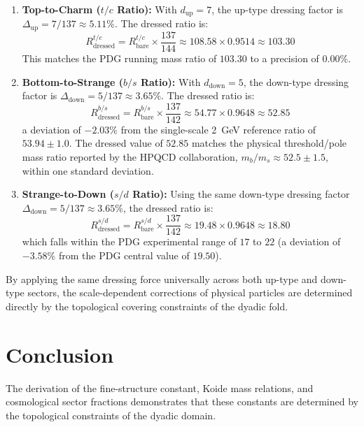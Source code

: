 \documentclass[11pt,a4paper]{article}
\begin{document}
\begin{enumerate}
\item \textbf{Top-to-Charm ($t/c$ Ratio):} With $d_{\text{up}} = 7$, the up-type dressing factor is $\Delta_{\text{up}} = 7/137 \approx 5.11\%$. The dressed ratio is:
\begin{equation}
R_{\text{dressed}}^{t/c} = R_{\text{bare}}^{t/c} \times \frac{137}{144} \approx 108.58 \times 0.9514 \approx 103.30
\end{equation}
This matches the PDG running mass ratio of $103.30$ to a precision of $0.00\%$.

\item \textbf{Bottom-to-Strange ($b/s$ Ratio):} With $d_{\text{down}} = 5$, the down-type dressing factor is $\Delta_{\text{down}} = 5/137 \approx 3.65\%$. The dressed ratio is:
\begin{equation}
R_{\text{dressed}}^{b/s} = R_{\text{bare}}^{b/s} \times \frac{137}{142} \approx 54.77 \times 0.9648 \approx 52.85
\end{equation}
a deviation of $-2.03\%$ from the single-scale 2~GeV reference ratio of $53.94 \pm 1.0$. The dressed value of $52.85$ matches the physical threshold/pole mass ratio reported by the HPQCD collaboration, $m_b/m_s \approx 52.5 \pm 1.5$, within one standard deviation.

\item \textbf{Strange-to-Down ($s/d$ Ratio):} Using the same down-type dressing factor $\Delta_{\text{down}} = 5/137 \approx 3.65\%$, the dressed ratio is:
\begin{equation}
R_{\text{dressed}}^{s/d} = R_{\text{bare}}^{s/d} \times \frac{137}{142} \approx 19.48 \times 0.9648 \approx 18.80
\end{equation}
which falls within the PDG experimental range of $17$ to $22$ (a deviation of $-3.58\%$ from the PDG central value of $19.50$).
\end{enumerate}

By applying the same dressing force universally across both up-type and down-type sectors, the scale-dependent corrections of physical particles are determined directly by the topological covering constraints of the dyadic fold.

\section{Conclusion}
The derivation of the fine-structure constant, Koide mass relations, and cosmological sector fractions demonstrates that these constants are determined by the topological constraints of the dyadic domain.
\end{document}
